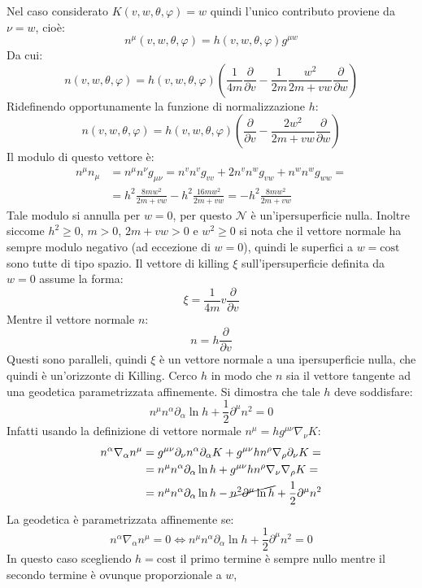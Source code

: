 \documentclass[]{scrartcl}
\newcommand{\pd}{\partial}
\newcommand{\pfrac}[1]{\frac{\partial}{\partial #1}}
\newcommand{\cost}{\mathrm{cost}}
\begin{document}
Nel caso considerato $ K(v,w,\theta,\varphi) = w $ quindi l'unico contributo proviene da $ \nu = w $, cioè:
\[
  n^\mu(v,w,\theta,\varphi) = h(v,w,\theta,\varphi) g^{\mu w} %
\]
Da cui:
\[
  n(v,w,\theta,\varphi) = h(v,w,\theta,\varphi) \left( \frac{1}{4 m} \pfrac{v} - \frac{1}{2m}\frac{w^2}{2m + vw} \pfrac{w}  \right)
\]
Ridefinendo opportunamente la funzione di normalizzazione $ h $:
\[
  n(v,w,\theta,\varphi) = h(v,w,\theta,\varphi) \left( \pfrac{v} - \frac{2w^2}{2m + vw} \pfrac{w}  \right)
\]
Il modulo di questo vettore è:
\begin{align*}
  n^{\mu}n_{\mu} &=  n^{\mu}n^{\nu}g_{\mu\nu} = n^v n^v g_{vv} + 2 n^v n^w g_{vw} + n^w n^w g_{ww} = \\
                 &= h^2 \frac{8mw^2}{2m + vw} - h^2 \frac{16mw^2}{2m + vw} = -h^2 \frac{8mw^2}{2m + vw}
\end{align*}
Tale modulo si annulla per $ w = 0 $, per questo $ \mathcal{N} $ è un'ipersuperficie nulla.
Inoltre siccome $ h^2 \geq 0 $, $ m > 0 $, $ 2m + vw > 0 $ e $ w^2 \geq 0 $ si nota che il vettore normale
ha sempre modulo negativo (ad eccezione di $ w = 0 $), quindi le superfici a $ w = \cost $ sono tutte di tipo spazio.
Il vettore di killing $ \xi $ sull'ipersuperficie definita da $ w = 0 $ assume la forma:
\[
  \xi = \frac{1}{4m} v \pfrac{v}
\]
Mentre il vettore normale $ n $:
\[
  n = h \pfrac{v}
\]
Questi sono paralleli, quindi $ \xi $ è un vettore normale a una ipersuperficie nulla, che quindi è un'orizzonte
di Killing. Cerco $ h $ in modo che $ n $ sia il vettore tangente ad una geodetica parametrizzata affinemente.
Si dimostra che tale $ h $ deve soddisfare:
\[
  n^\mu n^\alpha \pd_\alpha \ln h + \frac{1}{2}\pd^\mu n^2 = 0
\]
Infatti usando la definizione di vettore normale $ n^\mu = h g^{\mu\nu} \nabla_\nu K $:
\begin{align*}
  n^\alpha \nabla_\alpha n^\mu & = g^{\mu\nu} \pd_\nu n^\alpha \pd_\alpha K + g^{\mu\nu} h n^\rho \nabla_\rho \pd_\nu K = \\
                               & = n^\mu n^\alpha \pd_\alpha \ln h + g^{\mu\nu} h n^\rho \nabla_\nu \nabla_\rho K = \\
                               & = n^\mu n^\alpha \pd_\alpha \ln h - \cancel{n^2 \pd^\mu \ln h} + \frac{1}{2}\pd^\mu n^2
\end{align*}
La geodetica è parametrizzata affinemente se:
\[
  n^\alpha \nabla_\alpha n^\mu = 0 \Leftrightarrow
  n^\mu n^\alpha \pd_\alpha \ln h + \frac{1}{2}\pd^\mu n^2 = 0
\]
In questo caso scegliendo $ h = \cost $ il primo termine è sempre nullo mentre il secondo termine è ovunque proporzionale a $ w $,
\end{document}

